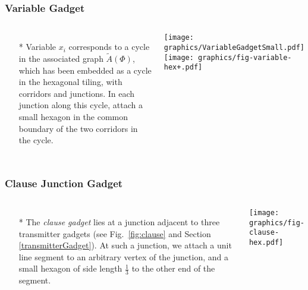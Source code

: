 \documentclass{beamer}
\begin{document}
\begin{frame} \frametitle{Variable Gadget}
    \begin{columns}[c]
        \begin{itemize}
            \item[*] Variable $x_i$ corresponds to a cycle in the associated graph $\tilde{A}(\Phi)$, which has been embedded as a cycle in the hexagonal tiling, with corridors and junctions. 
In each junction along this cycle, attach a small hexagon in the common boundary of the two corridors in the cycle. 
        \end{itemize}
                    \begin{minipage}{\linewidth}
            \begin{center}
            \texttt{[image: graphics/VariableGadgetSmall.pdf]}
            \label{gfx:VariableGadgetSmall.pdf}
            \texttt{[image: graphics/fig-variable-hex+.pdf]}
            \label{gfx:fig-variable-hex+.pdf}
            \end{center}
        \end{minipage}
    \end{columns}
\end{frame}

\begin{frame} \frametitle{Clause Junction Gadget}
    \begin{columns}[c]
        \begin{itemize}
            \item[*] The {\it clause gadget} lies at a junction adjacent to three transmitter gadgets (see Fig.~\ref{fig:clause} and Section \ref{transmitterGadget}).  At such a junction, we attach a unit line segment to an arbitrary vertex of the junction, and a small hexagon of side length $\frac{1}{3}$ to the other end of the segment. 
        \end{itemize}
        \begin{minipage}{\linewidth}
            \begin{center}
            \texttt{[image: graphics/fig-clause-hex.pdf]}
            \label{gfx:fig-clause-hex.pdf}
            \end{center}
        \end{minipage}
    \end{columns}
\end{frame}
\end{document}
